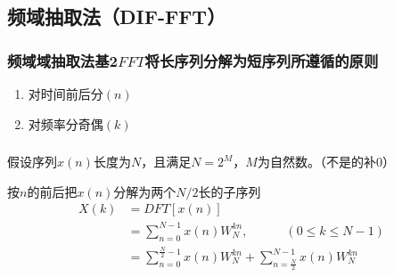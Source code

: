 \documentclass[notheorems,compress,mathserif,table]{beamer}
\begin{document}
\subsection{频域抽取法（DIF-FFT）}
\begin{frame}[shrink]\frametitle{频域域抽取法基2$FFT$将长序列分解为短序列所遵循的原则}%
\begin{enumerate}
  \item 对时间前后分$(n)$
  \item 对频率分奇偶$(k)$
\end{enumerate}
\end{frame}
\begin{frame}\frametitle{}%

\par 假设序列$x(n)$长度为$N$，且满足$N=2^{M}$，$M$为自然数。（不是的补0）
\par 按$n$的前后把$x(n)$分解为两个$N/2$长的子序列
    \begin{equation*} \label{eq:4}
    \begin{split}
    X(k)&= DFT[x(n)] \\
        &= \sum_{n=0}^{N-1}x(n)W_{N}^{kn},\quad\quad\quad (0\leq k\leq N-1)\\
        &= \sum_{n=0}^{\frac{N}{2}-1}x(n)W_{N}^{kn} +\sum_{n=\frac{N}{2}}^{N-1}x(n)W_{N}^{kn}\\
    \end{split}
    \end{equation*}
\end{frame}
\end{document}
